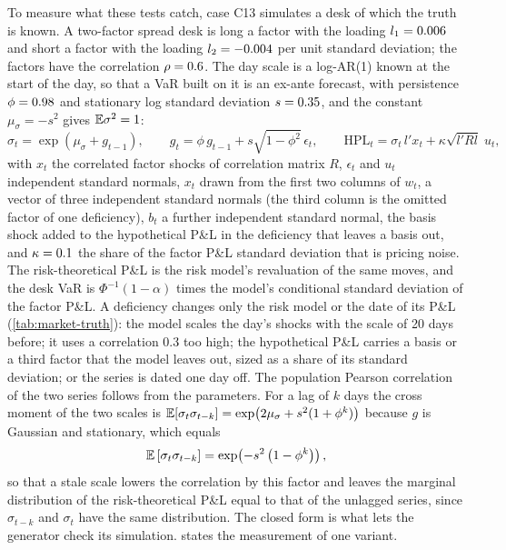 To measure what these tests catch, case C13 simulates a desk of which the truth is known. A two-factor spread desk is long a factor with the loading $l_1=0.006{}$ and short a
factor with the loading $l_2=-0.004{}$ per unit standard deviation; the factors have the correlation $\rho=0.6{}$. The day scale is a log-AR(1) known at the start of the day, so that a VaR
built on it is an ex-ante forecast, with persistence $\phi=0.98{}$ and stationary log standard deviation $s=0.35{}$, and the constant $\mu_\sigma=-s^2$ gives $\mathbb{E}\sigma^2=1$:
\begin{equation}
\sigma_t=\exp\!\left(\mu_\sigma+g_{t-1}\right),\qquad g_t=\phi\,g_{t-1}+s\sqrt{1-\phi^2}\,\epsilon_t,\qquad
\mathrm{HPL}_t=\sigma_t\,l'x_t+\kappa\sqrt{l'Rl}\;u_t,
\label{eq:mk-gen}
\end{equation}
with $x_t$ the correlated factor shocks of correlation matrix $R$, $\epsilon_t$ and $u_t$ independent standard normals, $x_t$ drawn from the first two columns of $w_t$, a vector of three independent standard normals (the third column is the omitted factor of one deficiency), $b_t$ a further independent standard normal, the basis shock added to the hypothetical P\&L in the deficiency that leaves a basis out, and $\kappa=0.1{}$ the share of the factor P\&L
standard deviation that is pricing noise. The risk-theoretical P\&L is the risk model's revaluation of the same moves, and the desk VaR is $\Phi^{-1}(1-\alpha)$ times the model's
conditional standard deviation of the factor P\&L. A deficiency changes only the risk model or the date of its P\&L (\cref{tab:market-truth}): the model scales the day's shocks with
the scale of 20 days before; it uses a correlation 0.3 too high; the hypothetical P\&L carries a basis or a third factor that the model leaves out, sized as a share of its
standard deviation; or the series is dated one day off. The population Pearson correlation of the two series follows from the parameters. For a lag of $k$ days the cross moment of the two
scales is $\mathbb{E}[\sigma_t\sigma_{t-k}]=\exp\!\left(2\mu_\sigma+s^2(1+\phi^k)\right)$ because $g$ is Gaussian and stationary, which equals
\begin{equation}
\mathbb{E}\left[\sigma_t\sigma_{t-k}\right]=\exp\!\left(-s^2\left(1-\phi^{k}\right)\right),
\label{eq:mk-pearson}
\end{equation}
so that a stale scale lowers the correlation by this factor and leaves the marginal distribution of the risk-theoretical P\&L equal to that of the unlagged series, since $\sigma_{t-k}$ and $\sigma_t$
have the same distribution. The closed form is what lets the generator check its simulation.  states the measurement of one variant.

